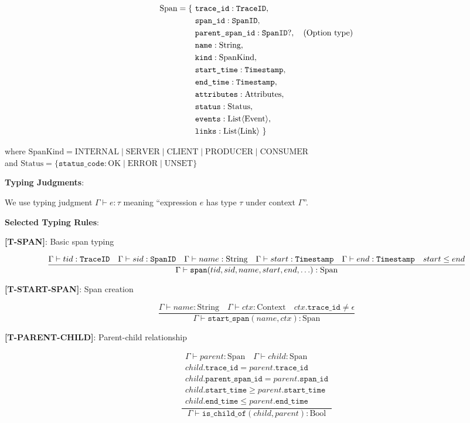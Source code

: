 \begin{align*}
\text{Span} = \{\ &\texttt{trace\_id}: \texttt{TraceID}, \\
               &\texttt{span\_id}: \texttt{SpanID}, \\
               &\texttt{parent\_span\_id}: \texttt{SpanID}?, \quad \text{(Option type)} \\
               &\texttt{name}: \text{String}, \\
               &\texttt{kind}: \text{SpanKind}, \\
               &\texttt{start\_time}: \texttt{Timestamp}, \\
               &\texttt{end\_time}: \texttt{Timestamp}, \\
               &\texttt{attributes}: \text{Attributes}, \\
               &\texttt{status}: \text{Status}, \\
               &\texttt{events}: \text{List⟨Event⟩}, \\
               &\texttt{links}: \text{List⟨Link⟩}\ \}
\end{align*}

where $\text{SpanKind} = \text{INTERNAL} \mid \text{SERVER} \mid \text{CLIENT} \mid \text{PRODUCER} \mid \text{CONSUMER}$ \\
and $\text{Status} = \{\texttt{status\_code}: \text{OK} \mid \text{ERROR} \mid \text{UNSET}\}$

\textbf{Typing Judgments}:

We use typing judgment $\Gamma \vdash e : \tau$ meaning ``expression $e$ has type $\tau$ under context $\Gamma$''.

\textbf{Selected Typing Rules}:

\textbf{[T-SPAN]}: Basic span typing

\[
\frac{\Gamma \vdash tid : \texttt{TraceID} \quad \Gamma \vdash sid : \texttt{SpanID} \quad \Gamma \vdash name : \text{String} \quad \Gamma \vdash start : \texttt{Timestamp} \quad \Gamma \vdash end : \texttt{Timestamp} \quad start \leq end}
     {\Gamma \vdash \texttt{span}(tid, sid, name, start, end, \ldots) : \text{Span}}
\]

\textbf{[T-START-SPAN]}: Span creation

\[
\frac{\Gamma \vdash name : \text{String} \quad \Gamma \vdash ctx : \text{Context} \quad ctx.\texttt{trace\_id} \neq \epsilon}
     {\Gamma \vdash \texttt{start\_span}(name, ctx) : \text{Span}}
\]

\textbf{[T-PARENT-CHILD]}: Parent-child relationship

\[
\frac{\begin{array}{c}
      \Gamma \vdash parent : \text{Span} \quad \Gamma \vdash child : \text{Span} \\
      child.\texttt{trace\_id} = parent.\texttt{trace\_id} \\
      child.\texttt{parent\_span\_id} = parent.\texttt{span\_id} \\
      child.\texttt{start\_time} \geq parent.\texttt{start\_time} \\
      child.\texttt{end\_time} \leq parent.\texttt{end\_time}
      \end{array}}
     {\Gamma \vdash \texttt{is\_child\_of}(child, parent) : \text{Bool}}
\]

